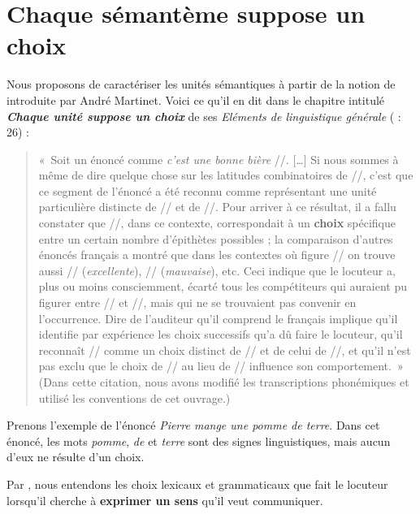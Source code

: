 \section{Chaque sémantème suppose un choix}\label{sec:2.3.1}

Nous proposons de caractériser les unités sémantiques à partir de la notion de  introduite par André Martinet. Voici ce qu’il en dit dans le chapitre intitulé \textbf{\textit{Chaque unité suppose un choix}} de ses \textit{Eléments de linguistique générale} (\citeyear{Martinet1960} : 26) :

\begin{quote}
    «~Soit un énoncé comme \textit{c’est une bonne bière} //. […] Si nous sommes à même de dire quelque chose sur les latitudes combinatoires de //, c’est que ce segment de l’énoncé a été reconnu comme représentant une unité particulière distincte de // et de //. Pour arriver à ce résultat, il a fallu constater que //, dans ce contexte, correspondait à un \textbf{choix} spécifique entre un certain nombre d’épithètes possibles ; la comparaison d’autres énoncés français a montré que dans les contextes où figure // on trouve aussi // (\textit{excellente}), // (\textit{mauvaise}), etc. Ceci indique que le locuteur a, plus ou moins consciemment, écarté tous les compétiteurs qui auraient pu figurer entre // et //, mais qui ne se trouvaient pas convenir en l’occurrence. Dire de l’auditeur qu’il comprend le français implique qu’il identifie par expérience les choix successifs qu’a dû faire le locuteur, qu’il reconnaît // comme un choix distinct de // et de celui de //, et qu’il n’est pas exclu que le choix de // au lieu de // influence son comportement.~» (Dans cette citation, nous avons modifié les transcriptions phonémiques et utilisé les conventions de cet ouvrage.)
\end{quote}

Prenons l’exemple de l’énoncé \textit{Pierre mange une pomme de terre}. Dans cet énoncé, les mots \textit{pomme}, \textit{de} et \textit{terre} sont des signes linguistiques, mais aucun d’eux ne résulte d’un choix.

\begin{styleLivreImportant}
Par , nous entendons les choix lexicaux et grammaticaux que fait le locuteur lorsqu’il cherche à \textbf{exprimer un sens} qu’il veut communiquer.
\end{styleLivreImportant}

